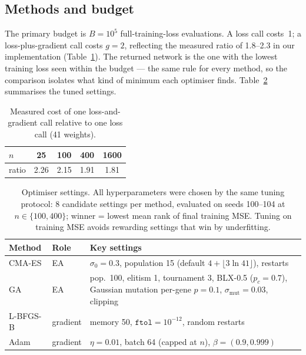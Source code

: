 \documentclass[11pt]{article}
\newcommand{\cmaes}{CMA-ES}
\newcommand{\lbfgs}{L-BFGS-B}
\newcommand{\B}{B}
\begin{document}
\subsection{Methods and budget}

The primary budget is $\B=10^5$ full-training-loss evaluations. A loss call costs~1; a
loss-plus-gradient call costs $g=2$, reflecting the measured ratio of 1.8--2.3 in our implementation
(Table~\ref{tab:gradcost}). The returned network is the one with the lowest training loss seen within
the budget --- the same rule for every method, so the comparison isolates what kind of minimum each
optimiser finds. Table~\ref{tab:optimisers} summarises the tuned settings.

\begin{table}[h]
  \centering
  \caption{Measured cost of one loss-and-gradient call relative to one loss call (41 weights).}
  \label{tab:gradcost}
  \small
  \begin{tabular}{@{}lcccc@{}}
    \toprule
    $n$ & 25 & 100 & 400 & 1600 \\
    \midrule
    ratio & 2.26 & 2.15 & 1.91 & 1.81 \\
    \bottomrule
  \end{tabular}
\end{table}

\begin{table}[h]
  \centering
  \caption{Optimiser settings. All hyperparameters were chosen by the same tuning protocol: 8 candidate
  settings per method, evaluated on seeds 100--104 at $n\in\{100,400\}$; winner = lowest mean rank of
  final training MSE. Tuning on training MSE avoids rewarding settings that win by underfitting.}
  \label{tab:optimisers}
  \small
  \begin{tabularx}{\linewidth}{@{}l l X@{}}
    \toprule
    Method & Role & Key settings \\
    \midrule
    \cmaes{} & EA & $\sigma_0=0.3$, population 15 (default $4+\lfloor3\ln 41\rfloor$), restarts \\
    GA & EA & pop.\ 100, elitism 1, tournament 3, BLX-0.5 ($p_c=0.7$), Gaussian mutation
             per-gene $p=0.1$, $\sigma_{\mathrm{mut}}=0.03$, clipping \\
    \lbfgs{} & gradient & memory 50, $\texttt{ftol}=10^{-12}$, random restarts \\
    Adam & gradient & $\eta=0.01$, batch 64 (capped at $n$), $\beta=(0.9,0.999)$ \citep{kingma2015adam} \\
    \bottomrule
  \end{tabularx}
\end{table}
\end{document}
